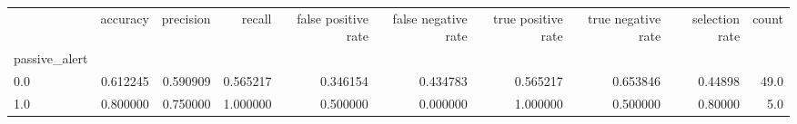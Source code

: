 \begin{tabular}{lrrrrrrrrr}
\toprule
{} &  accuracy &  precision &    recall &  false positive rate &  false negative rate &  true positive rate &  true negative rate &  selection rate &  count \\
passive\_alert &           &            &           &                      &                      &                     &                     &                 &        \\
\midrule
0.0           &  0.612245 &   0.590909 &  0.565217 &             0.346154 &             0.434783 &            0.565217 &            0.653846 &         0.44898 &   49.0 \\
1.0           &  0.800000 &   0.750000 &  1.000000 &             0.500000 &             0.000000 &            1.000000 &            0.500000 &         0.80000 &    5.0 \\
\bottomrule
\end{tabular}
